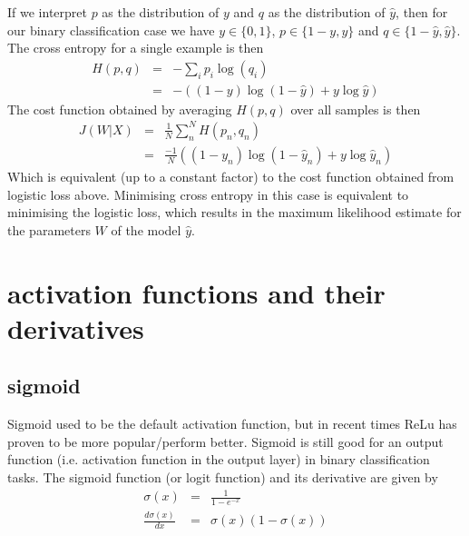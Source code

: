 \documentclass{article}
\begin{document}
If we interpret $p$ as the distribution of $y$ and $q$ as the distribution of $\hat{y}$, then for our binary classification case we have $y \in \{0,1\}$, $p \in \{1-y,y\}$ and $q \in \{1-\hat{y},\hat{y}\}$.
The cross entropy for a single example is then
\begin{eqnarray*}
H(p,q) & = & - \sum_i p_i \log(q_i) \\
 & = & - \left( (1-y) \log (1-\hat{y}) + y \log \hat{y}\right)
\end{eqnarray*}
The cost function obtained by averaging $H(p,q)$ over all samples is then
\begin{eqnarray*}
J(W|X) & = & \frac{1}{N}\sum_n^N H(p_n,q_n) \\
 & = &  \frac{-1}{N} \left((1-y_n) \log (1-\hat{y}_n) + y \log \hat{y}_n\right)
\end{eqnarray*}
Which is equivalent (up to a constant factor) to the cost function obtained from logistic loss above. Minimising cross entropy in this case is equivalent to minimising the logistic loss, which results in the maximum likelihood estimate for the parameters $W$ of the model $\hat{y}$.


\section{activation functions and their derivatives}


\subsection{sigmoid}
Sigmoid used to be the default activation function, but in recent times ReLu has proven to be more popular/perform better. Sigmoid is still good for an output function (i.e. activation function in the output layer) in binary classification tasks.
The sigmoid function (or logit function) and its derivative are given by
\begin{eqnarray*}
\sigma(x) & = &\frac{1}{1 - e^{-x}} \\
\frac{d\sigma(x)}{dx} & = & \sigma(x)(1 - \sigma(x)) \\
\end{eqnarray*}
\end{document}
